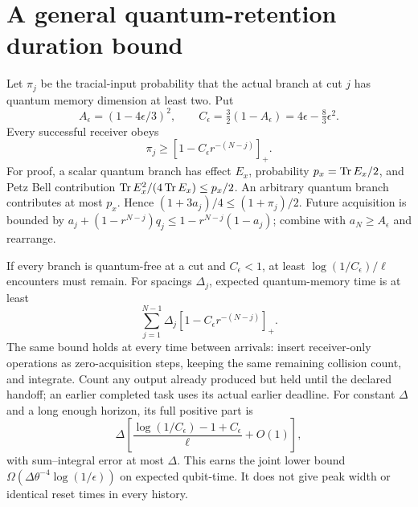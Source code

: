 \section{A general quantum-retention duration bound}
Let $\pi_j$ be the tracial-input probability that the actual branch at cut $j$
has quantum memory dimension at least two. Put
\[
 A_\epsilon=(1-4\epsilon/3)^2,\qquad
 C_\epsilon=\tfrac32(1-A_\epsilon)=4\epsilon-\tfrac83\epsilon^2.
\]
Every successful receiver obeys
\begin{equation}
 \pi_j\ge[1-C_\epsilon r^{-(N-j)}]_+.\label{eq:retention}
\end{equation}
For proof, a scalar quantum branch has effect $E_x$, probability
$p_x=\operatorname{Tr} E_x/2$, and Petz Bell contribution
$\operatorname{Tr} E_x^2/(4\operatorname{Tr} E_x)\le p_x/2$. An arbitrary quantum branch contributes
at most $p_x$. Hence $(1+3a_j)/4\le(1+\pi_j)/2$. Future acquisition is
bounded by $a_j+(1-r^{N-j})q_j\le1-r^{N-j}(1-a_j)$; combine with
$a_N\ge A_\epsilon$ and rearrange.

If every branch is quantum-free at a cut and $C_\epsilon<1$, at least
$\log(1/C_\epsilon)/\ell$ encounters must remain. For spacings $\Delta_j$,
expected quantum-memory time is at least
\[
 \sum_{j=1}^{N-1}\Delta_j[1-C_\epsilon r^{-(N-j)}]_+.
\]
The same bound holds at every time between arrivals: insert receiver-only
operations as zero-acquisition steps, keeping the same remaining collision
count, and integrate. Count any output already produced but held until the
declared handoff; an earlier completed task uses its actual earlier deadline.
For constant $\Delta$ and a long enough horizon, its full positive part is
\[
 \Delta\left[\frac{\log(1/C_\epsilon)-1+C_\epsilon}{\ell}+O(1)\right],
\]
with sum--integral error at most $\Delta$. This earns the joint lower bound
$\Omega(\Delta\theta^{-4}\log(1/\epsilon))$ on expected qubit-time. It
does not give peak width or identical reset times in every history.
